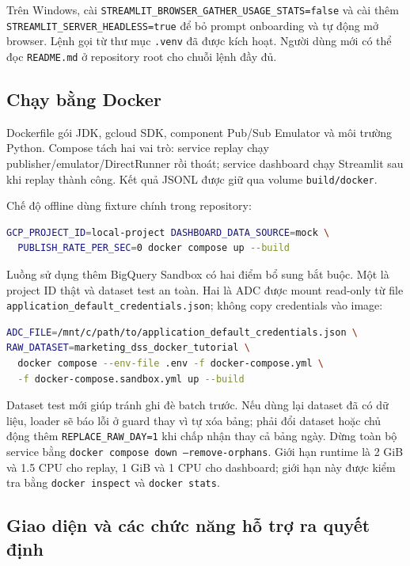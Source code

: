 Trên Windows, cài \texttt{STREAMLIT\_BROWSER\_GATHER\_USAGE\_STATS=false} và cài thêm \texttt{STREAMLIT\_SERVER\_HEADLESS=true} để bỏ prompt onboarding và tự động mở browser. Lệnh gọi từ thư mục \texttt{.venv} đã được kích hoạt. Người dùng mới có thể đọc \texttt{README.md} ở repository root cho chuỗi lệnh đầy đủ. \medskip

\subsection{Chạy bằng Docker} 

Dockerfile gói JDK, gcloud SDK, component Pub/Sub Emulator và môi trường Python. Compose tách hai vai trò: service replay chạy publisher/emulator/DirectRunner rồi thoát; service dashboard chạy Streamlit sau khi replay thành công. Kết quả JSONL được giữ qua volume \texttt{build/docker}. \medskip

Chế độ offline dùng fixture chính trong repository: \medskip

\begin{lstlisting}[language=bash,basicstyle=\ttfamily\small]
GCP_PROJECT_ID=local-project DASHBOARD_DATA_SOURCE=mock \
  PUBLISH_RATE_PER_SEC=0 docker compose up --build
\end{lstlisting} \medskip

Luồng sử dụng thêm BigQuery Sandbox có hai điểm bổ sung bắt buộc. Một là project ID thật và dataset test an toàn. Hai là ADC được mount read-only từ file \texttt{application\_default\_credentials.json}; không copy credentials vào image: \medskip

\begin{lstlisting}[language=bash,basicstyle=\ttfamily\small]
ADC_FILE=/mnt/c/path/to/application_default_credentials.json \
RAW_DATASET=marketing_dss_docker_tutorial \
  docker compose --env-file .env -f docker-compose.yml \
  -f docker-compose.sandbox.yml up --build
\end{lstlisting} \medskip

Dataset test mới giúp tránh ghi đè batch trước. Nếu dùng lại dataset đã có dữ liệu, loader sẽ báo lỗi ở guard thay vì tự xóa bảng; phải đổi dataset hoặc chủ động thêm \texttt{REPLACE\_RAW\_DAY=1} khi chấp nhận thay cả bảng ngày. Dừng toàn bộ service bằng \texttt{docker compose down --remove-orphans}. Giới hạn runtime là 2 GiB và 1.5 CPU cho replay, 1 GiB và 1 CPU cho dashboard; giới hạn này được kiểm tra bằng \texttt{docker inspect} và \texttt{docker stats}.

\subsection{Giao diện và các chức năng hỗ trợ ra quyết định}

